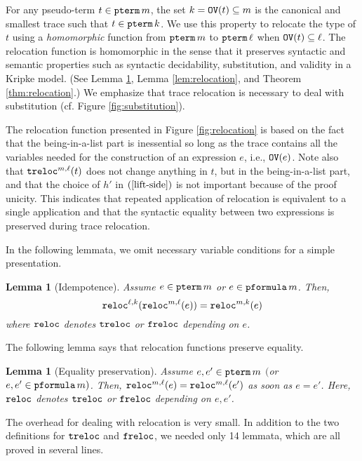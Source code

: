 \documentclass{svjour3}                     %
\newtheorem{lem}[thm]{Lemma}
\newcommand{\tm}{\subseteq}
\newcommand{\tpterm}{\textup{\tt pterm}}
\newcommand{\tpfml}{\textup{\tt pformula}}
\newcommand{\tPH}{\textup{\tt OV}}
\newcommand{\ttlift}{\textup{\tt treloc}}
\newcommand{\tflift}{\textup{\tt freloc}}
\newcommand{\tlift}{\textup{\tt reloc}}
\begin{document}
For any pseudo-term $t \in \tpterm \, m$, the set $k = \tPH(t) \tm m$ is the canonical and smallest trace such that $t\in \tpterm\, k$. 
We use this property to relocate the type of $t$ using a {\em homomorphic} function from $\tpterm\, m$ to $\tpterm\, \ell$ when $\tPH(t) \tm \ell$.
The relocation function is homomorphic in the sense that it preserves syntactic and semantic properties such as syntactic decidability, substitution, and validity in a Kripke model. (See Lemma \ref{eq-preservation}, Lemma \ref{lem:relocation}, and Theorem \ref{thm:relocation}.)
We emphasize that trace relocation is necessary to deal with
substitution (cf. Figure \ref{fig:substitution}).

The relocation function presented in Figure \ref{fig:relocation} is based on the fact that the being-in-a-list part is inessential so long as the trace contains all the variables needed for the construction of an expression $e$, i.e., $\tPH(e)$.
Note also that $\ttlift^{m,\ell}(t)$ does not change anything in $t$,
but in the being-in-a-list part, and that the choice of $h'$ in
$(\ref{lift-side})$ is not important because of the proof unicity. This
indicates that repeated application of relocation is equivalent to a
single application and that the syntactic equality between two
expressions is preserved during trace relocation. 

In the following lemmata, we omit necessary variable conditions for a
simple presentation. 

\begin{lem}[Idempotence]
  Assume $e\in \tpterm \, m$ or $e \in \tpfml \, m$.
  Then,
\[
\tlift^{\ell,k}(\tlift^{m,\ell}(e))  =  \tlift^{m, k}(e)
\]
where $\tlift$ denotes $\ttlift$ or $\tflift$ depending on $e$.
\end{lem}

\noindent The following lemma says that relocation functions preserve equality.

\begin{lem}[Equality preservation]\label{eq-preservation}
  Assume $e, e' \in \tpterm\, m$ $($or $e, e' \in \tpfml\, m)$.
  Then, $\tlift^{m, \ell} (e) = \tlift^{m, \ell} (e')$ as soon as $e =e'$. Here, $\tlift$ denotes $\ttlift$ or $\tflift$ depending on $e, e'$.
\end{lem}

The overhead for dealing with relocation is very small. In addition to the two definitions for $\ttlift$ and $\tflift$, we needed only 14 lemmata, which are all proved in several lines.
\end{document}
